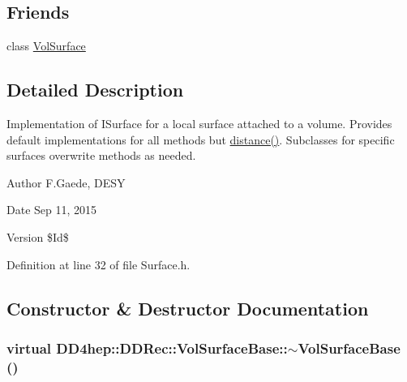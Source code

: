 \subsection*{Friends}
\begin{DoxyCompactItemize}
\item 
class \hyperlink{class_d_d4hep_1_1_d_d_rec_1_1_vol_surface_base_aac662841c478da205fce85f4b5b036f2}{VolSurface}
\end{DoxyCompactItemize}


\subsection{Detailed Description}
Implementation of ISurface for a local surface attached to a volume. Provides default implementations for all methods but \hyperlink{class_d_d4hep_1_1_d_d_rec_1_1_vol_surface_base_afb85bf6e8e6b87fb52e67e26609b1048}{distance()}. Subclasses for specific surfaces overwrite methods as needed.

\begin{DoxyAuthor}{Author}
F.Gaede, DESY 
\end{DoxyAuthor}
\begin{DoxyDate}{Date}
Sep 11, 2015 
\end{DoxyDate}
\begin{DoxyVersion}{Version}
\$Id\$ 
\end{DoxyVersion}


Definition at line 32 of file Surface.h.

\subsection{Constructor \& Destructor Documentation}
\hypertarget{class_d_d4hep_1_1_d_d_rec_1_1_vol_surface_base_a675e603aff05bfb6f75fac1929f2b8df}{
\subsubsection[{$\sim$VolSurfaceBase}]{\setlength{\rightskip}{0pt plus 5cm}virtual DD4hep::DDRec::VolSurfaceBase::$\sim$VolSurfaceBase ()}}
\label{class_d_d4hep_1_1_d_d_rec_1_1_vol_surface_base_a675e603aff05bfb6f75fac1929f2b8df}


